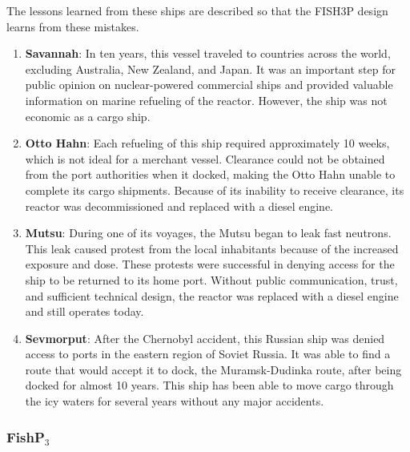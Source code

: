 \documentclass[12pt]{article}
\begin{document}
The lessons learned from these ships are described so that the FISH3P design learns from these mistakes.

\begin{enumerate}
\item \textbf{Savannah}: \newline
In ten years, this vessel traveled to countries across the world, excluding Australia, New Zealand, and Japan.  It was an important step for public opinion on nuclear-powered commercial ships and provided valuable information on marine refueling of the reactor.  However, the ship was not economic as a cargo ship.  
\item \textbf{Otto Hahn}: \newline
Each refueling of this ship required approximately 10 weeks, which is not ideal for a merchant vessel.  Clearance could not be obtained from the port authorities when it docked, making the Otto Hahn unable to complete its cargo shipments.  Because of its inability to receive clearance, its reactor was decommissioned and replaced with a diesel engine.  
\item \textbf{Mutsu}: \newline
During one of its voyages, the Mutsu began to leak fast neutrons.  This leak caused protest from the local inhabitants because of the increased exposure and dose.  These protests were successful in denying access for the ship to be returned to its home port.  Without public communication, trust, and sufficient technical design, the reactor was replaced with a diesel engine and still operates today.
\item \textbf{Sevmorput}: \newline
After the Chernobyl accident, this Russian ship was denied access to ports in the eastern region of Soviet Russia.  It was able to find a route that would accept it to dock, the Muramsk-Dudinka route, after being docked for almost 10 years.  This ship has been able to move cargo through the icy waters for several years without any major accidents. 

\end{enumerate}

\subsubsection{FishP$_3$}
\end{document}
